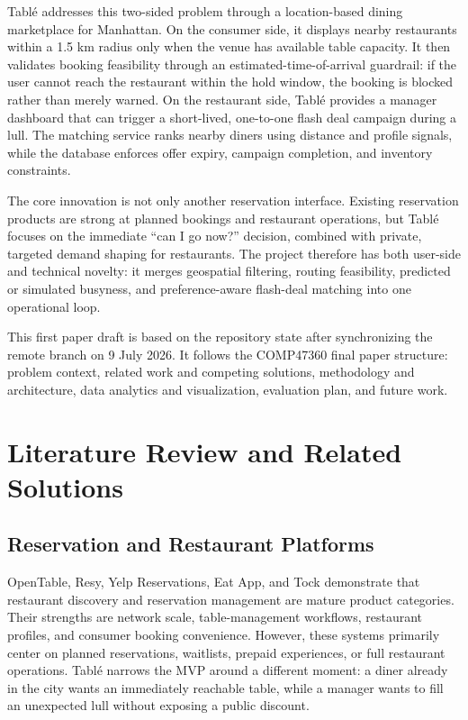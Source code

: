 \documentclass[conference]{IEEEtran}
\begin{document}
Tabl\'e addresses this two-sided problem through a location-based dining marketplace for Manhattan. On the consumer side, it displays nearby restaurants within a 1.5 km radius only when the venue has available table capacity. It then validates booking feasibility through an estimated-time-of-arrival guardrail: if the user cannot reach the restaurant within the hold window, the booking is blocked rather than merely warned. On the restaurant side, Tabl\'e provides a manager dashboard that can trigger a short-lived, one-to-one flash deal campaign during a lull. The matching service ranks nearby diners using distance and profile signals, while the database enforces offer expiry, campaign completion, and inventory constraints.

The core innovation is not only another reservation interface. Existing reservation products are strong at planned bookings and restaurant operations, but Tabl\'e focuses on the immediate ``can I go now?'' decision, combined with private, targeted demand shaping for restaurants. The project therefore has both user-side and technical novelty: it merges geospatial filtering, routing feasibility, predicted or simulated busyness, and preference-aware flash-deal matching into one operational loop.

This first paper draft is based on the repository state after synchronizing the remote branch on 9 July 2026. It follows the COMP47360 final paper structure: problem context, related work and competing solutions, methodology and architecture, data analytics and visualization, evaluation plan, and future work.

\section{Literature Review and Related Solutions}
\subsection{Reservation and Restaurant Platforms}
OpenTable, Resy, Yelp Reservations, Eat App, and Tock demonstrate that restaurant discovery and reservation management are mature product categories. Their strengths are network scale, table-management workflows, restaurant profiles, and consumer booking convenience. However, these systems primarily center on planned reservations, waitlists, prepaid experiences, or full restaurant operations. Tabl\'e narrows the MVP around a different moment: a diner already in the city wants an immediately reachable table, while a manager wants to fill an unexpected lull without exposing a public discount.
\end{document}

